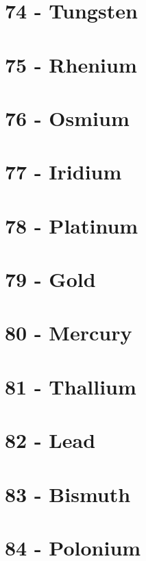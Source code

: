 \documentclass{book}
\begin{document}
\section{74 - Tungsten}
\label{sec:elem-tungsten}

\section{75 - Rhenium}
\label{sec:elem-rhenium}

\section{76 - Osmium}
\label{sec:elem-osmium}

\section{77 - Iridium}
\label{sec:elem-iridium}

\section{78 - Platinum}
\label{sec:elem-platinum}

\section{79 - Gold}
\label{sec:elem-gold}

\section{80 - Mercury}
\label{sec:elem-mercury}

\section{81 - Thallium}
\label{sec:elem-thallium}

\section{82 - Lead}
\label{sec:elem-lead}

\section{83 - Bismuth}
\label{sec:elem-bismuth}

\section{84 - Polonium}
\label{sec:elem-polonium}
\end{document}
